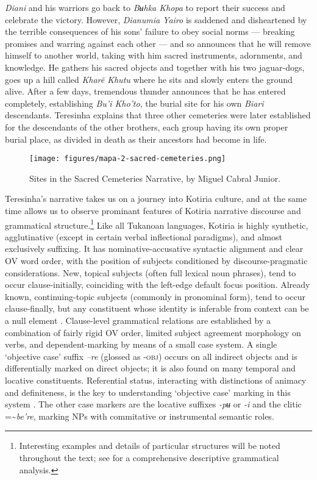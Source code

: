 \documentclass[output=paper,
modfonts,nonflat
]{langsci/langscibook}
\begin{document}
\textit{Diani} and his warriors go back to \textit{Bʉhka Khopa} to report their success and celebrate the victory. However, \textit{Dianumia Yairo} is saddened and disheartened by the terrible consequences of his sons’ failure to obey social norms — breaking promises and warring against each other — and so announces that he will remove himself to another world, taking with him sacred instruments, adornments, and knowledge. He gathers his sacred objects and together with his two jaguar-dogs, goes up a hill called \textit{Kharẽ Khutu} where he sits and slowly enters the ground alive. After a few days, tremendous thunder announces that he has entered completely, establishing \textit{Bu’i Kho’to}, the burial site for his own \textit{Biari} descendants. Teresinha explains that three other cemeteries were later established for the descendants of the other brothers, each group having its own proper burial place, as divided in death as their ancestors had become in life.\\ 

\begin{figure}[t]
\texttt{[image: figures/mapa-2-sacred-cemeteries.png]}
\caption{Sites in the Sacred Cemeteries Narrative, by Miguel Cabral Junior.\label{maptwo}}
\end{figure}

Teresinha’s narrative takes us on a journey into Kotiria culture, and at the same time allows us to observe prominant features of Kotiria narrative discourse and grammatical structure.\footnote{Interesting examples and details of particular structures will be noted throughout the text; see \citealt{Stenzel2013} for a comprehensive descriptive grammatical analysis.} Like all Tukanoan languages, Kotiria is highly synthetic, agglutinative (except in certain verbal inflectional paradigms), and almost exclusively suffixing. It has nominative-accusative syntactic alignment and clear OV word order, with the position of subjects conditioned by discourse-pragmatic considerations. New, topical subjects (often full lexical noun phrases), tend to occur clause-initially, coinciding with the left-edge default focus position. Already known, continuing-topic subjects (commonly in pronominal form), tend to occur clause-finally, but any constituent whose identity is inferable from context can be a null element \parencite{Stenzel2015}. Clause-level grammatical relations are established by a combination of fairly rigid OV order, limited subject agreement morphology on verbs, and dependent-marking by means of a small case system. A single ‘objective case’ suffix \textit{–re} (glossed as \textsc{-obj}) occurs on all indirect objects and is differentially marked on direct objects; it is also found on many temporal and locative constituents. Referential status, interacting with distinctions of animacy and definiteness, is the key to understanding ‘objective case’ marking in this system \parencite{Stenzel2008b}. The other case markers are the locative suffixes \textit{-pʉ} or \textit{-i} and the clitic ={\textasciitilde}\textit{be’re}, marking NPs with commitative or instrumental semantic roles.
\end{document}
